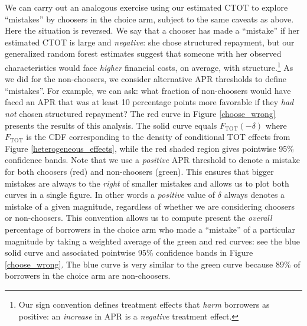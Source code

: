 \documentclass[12pt, a4paper, colorinlistoftodos]{article}
\begin{document}
We can carry out an analogous exercise using our estimated CTOT to explore ``mistakes'' by choosers in the choice arm, subject to the same caveats as above.
Here the situation is reversed.
We say that a chooser has made a ``mistake'' if her estimated CTOT is large and \emph{negative}: she chose structured repayment, but our generalized random forest estimates suggest that someone with her observed characteristics would face \emph{higher} financial costs, on average, with structure.\footnote{Our sign convention defines treatment effects that \emph{harm} borrowers as positive: an \emph{increase} in APR is a \emph{negative} treatment effect.}
As we did for the non-choosers, we consider alternative APR thresholds to define ``mistakes''.
For example, we can ask: what fraction of non-choosers would have faced an APR that was at least 10 percentage points more favorable if they \emph{had not} chosen structured repayment?
The red curve in Figure \ref{choose_wrong} presents the results of this analysis.
The solid curve equals $F_{\text{TOT}}(-\delta)$ where $F_{\text{TOT}}$ is the CDF corresponding to the density of conditional TOT effects from Figure \ref{heterogeneous_effects}, while the red shaded region gives pointwise 95\% confidence bands.
Note that we use a \emph{positive} APR threshold to denote a mistake for both choosers (red) and non-choosers (green).
This ensures that bigger mistakes are always to the \emph{right} of smaller mistakes and allows us to plot both curves in a single figure.
In other words a \emph{positive} value of $\delta$ always denotes a mistake of a given magnitude, regardless of whether we are considering choosers or non-choosers.
This convention allows us to compute present the \emph{overall} percentage of borrowers in the choice arm who made a ``mistake'' of a particular magnitude by taking a weighted average of the green and red curves: see the blue solid curve and associated pointwise 95\% confidence bands in Figure \ref{choose_wrong}.
The blue curve is very similar to the green curve because 89\% of borrowers in the choice arm are non-choosers.


\end{document}
